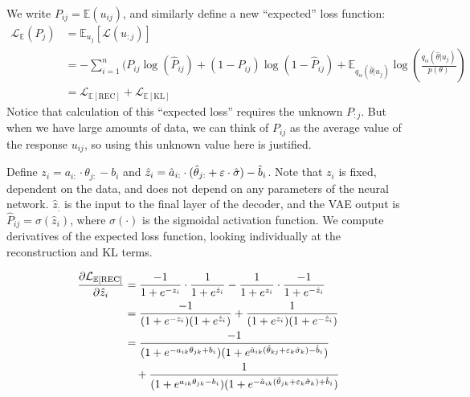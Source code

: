 We write $P_{ij} = \mathbb{E}(u_{ij})$, and similarly define a new ``expected'' loss function:
\begin{equation}
  \begin{split}
  \mathcal{L}_\mathbb{E}(P_j) &= \mathbb{E}_{u_j}[\mathcal{L}(u_{:j})] \\
  &= -\sum_{i=1}^n (P_{ij} \log(\hat P_{ij}) + (1-P_{ij})\log(1 - \hat P_{ij}) + \mathbb{E}_{q_\alpha(\hat \theta | u_j)}\log\left( \frac{q_{\alpha}(\hat \theta |u_j)}{p(\theta)}\right) \\
    &= \mathcal{L}_{\mathbb{E}[\text{REC}]} + \mathcal{L}_{\mathbb{E}[\text{KL}]}
  \end{split}
  \label{eq:expected_loss}
\end{equation}
Notice that calculation of this ``expected loss'' requires the unknown $P_{:j}$. But when we have large amounts of data, we can think of $P_{ij}$ as the average value of the response $u_{ij}$, so using this unknown value here is justified.

Define $z_i = a_{i:} \cdot \theta_{j:} - b_i$ and $\hat z_i = \hat a_{i:} \cdot (\hat \theta_{j:} + \varepsilon \cdot \hat \sigma) - \hat b_i$. Note that $z_i$ is fixed, dependent on the data, and does not depend on any parameters of the neural network. $\hat z_:$ is the input to the final layer of the decoder, and the VAE output is $\hat P_{ij} = \sigma(\hat z_i)$, where $\sigma(\cdot)$ is the sigmoidal activation function. We compute derivatives of the expected loss function, looking individually at the reconstruction and KL terms. 

\begin{equation}
  \begin{split}
  \frac{\partial \mathcal{L}_{\mathbb{E}[\text{REC}]}}{\partial \hat z_i} &= \frac{-1}{1 + e^{-z_i}}\cdot \frac{1}{1 + e^{\hat z_i}} - \frac{1}{1 + e^{z_i}}\cdot \frac{-1}{1 + e^{-\hat z_i}} \\
  &= \frac{-1}{(1 + e^{-z_i})(1 + e^{\hat z_i})} + \frac{1}{(1 + e^{z_i})(1 + e^{-\hat z_i})} \\
  &= \frac{-1}{(1 + e^{-a_{ik}\theta_{jk} + b_i})(1 + e^{\hat a_{ik} (\hat \theta_{kj} + \varepsilon_k \hat \sigma_k) - \hat b_i})} \\
  &\quad + \frac{1}{(1 + e^{a_{ik}\theta_{jk} - b_i})(1 + e^{-\hat a_{ik}(\hat \theta_{jk} + \varepsilon_k \hat \sigma_k) + \hat b_i})} 
\end{split}
  \label{eq:z_deriv}
\end{equation}


